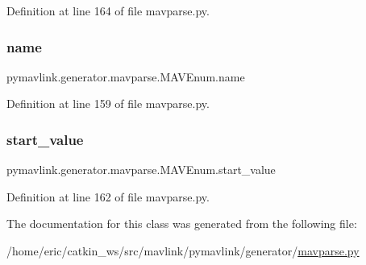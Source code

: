 Definition at line 164 of file mavparse.\+py.

\mbox{\label{classpymavlink_1_1generator_1_1mavparse_1_1MAVEnum_a2fddee7aa1c4e8898fb960602625d3b6}} 
\subsubsection{\texorpdfstring{name}{name}}
{\footnotesize\ttfamily pymavlink.\+generator.\+mavparse.\+M\+A\+V\+Enum.\+name}



Definition at line 159 of file mavparse.\+py.

\mbox{\label{classpymavlink_1_1generator_1_1mavparse_1_1MAVEnum_aa1f35a0fc1111618288150eca229a106}} 
\subsubsection{\texorpdfstring{start\_value}{start\_value}}
{\footnotesize\ttfamily pymavlink.\+generator.\+mavparse.\+M\+A\+V\+Enum.\+start\+\_\+value}



Definition at line 162 of file mavparse.\+py.



The documentation for this class was generated from the following file\+:\begin{DoxyCompactItemize}
\item 
/home/eric/catkin\+\_\+ws/src/mavlink/pymavlink/generator/\mbox{\hyperlink{mavparse_8py}{mavparse.\+py}}\end{DoxyCompactItemize}
